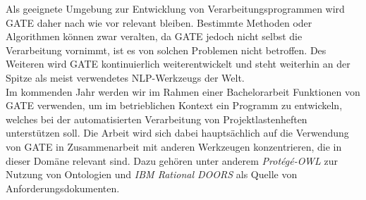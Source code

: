 \documentclass[12pt]{report}
\begin{document}
Als geeignete Umgebung zur Entwicklung von Verarbeitungsprogrammen wird GATE daher nach wie vor relevant bleiben. Bestimmte Methoden oder Algorithmen können zwar veralten, da GATE jedoch nicht selbst die Verarbeitung vornimmt, ist es von solchen Problemen nicht betroffen. Des Weiteren wird GATE kontinuierlich weiterentwickelt und steht weiterhin an der Spitze als meist verwendetes NLP-Werkzeugs der Welt. \\

Im kommenden Jahr werden wir im Rahmen einer Bachelorarbeit Funktionen von GATE verwenden, um im betrieblichen Kontext ein Programm zu entwickeln, welches bei der automatisierten Verarbeitung von Projektlastenheften unterstützen soll. Die Arbeit wird sich dabei hauptsächlich auf die Verwendung von GATE in Zusammenarbeit mit anderen Werkzeugen konzentrieren, die in dieser Domäne relevant sind. Dazu gehören unter anderem \textit{Protégé-OWL} zur Nutzung von Ontologien und \textit{IBM Rational DOORS} als Quelle von Anforderungsdokumenten.
\end{document}
